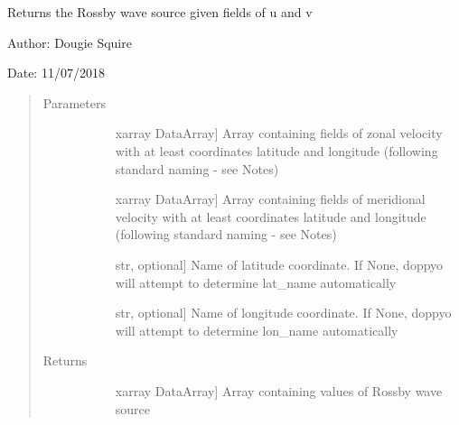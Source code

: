 \documentclass[letterpaper,10pt,english]{sphinxmanual}
\begin{document}

\begin{fulllineitems}
\label{\detokenize{diagnostic_doc:diagnostic.Rossby_wave_source}}
Returns the Rossby wave source given fields of u and v

\begin{DUlineblock}{0em}
\item[] Author: Dougie Squire
\item[] Date: 11/07/2018
\end{DUlineblock}
\begin{quote}\begin{description}
\item[{Parameters}] \leavevmode\begin{description}
\item[{}] \leavevmode{[}xarray DataArray{]}
Array containing fields of zonal velocity with at least coordinates latitude and longitude                     (following standard naming - see Notes)

\item[{}] \leavevmode{[}xarray DataArray{]}
Array containing fields of meridional velocity with at least coordinates latitude and                     longitude (following standard naming - see Notes)

\item[{}] \leavevmode{[}str, optional{]}
Name of latitude coordinate. If None, doppyo will attempt to determine lat\_name                     automatically

\item[{}] \leavevmode{[}str, optional{]}
Name of longitude coordinate. If None, doppyo will attempt to determine lon\_name                     automatically

\end{description}

\item[{Returns}] \leavevmode\begin{description}
\item[{}] \leavevmode{[}xarray DataArray{]}
Array containing values of Rossby wave source


\end{description}
\end{description}
\end{quote}
\end{fulllineitems}
\end{document}
